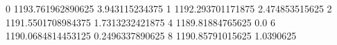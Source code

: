 0 1193.761962890625 3.943115234375
1 1192.293701171875 2.474853515625
2 1191.5501708984375 1.7313232421875
4 1189.81884765625 0.0
6 1190.0684814453125 0.2496337890625
8 1190.85791015625 1.0390625
